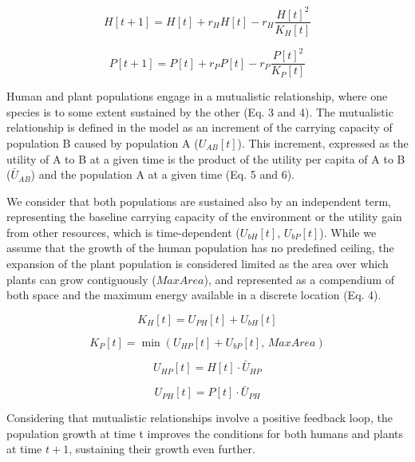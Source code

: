 \documentclass[
]{book}
\begin{document}
\begin{equation}
\tag{Eq. 1}
H[t+1]=H[t]+r_{H}H[t]-r_{H}\frac{H[t]^{2}}{K_{H}[t]}
\end{equation}

\begin{equation}
\tag{Eq. 2}
P[t+1]=P[t]+r_{P}P[t]-r_{P}\frac{P[t]^{2}}{K_{P}[t]}
\end{equation}

Human and plant populations engage in a mutualistic relationship, where one species is to some extent sustained by the other (Eq. 3 and 4). The mutualistic relationship is defined in the model as an increment of the carrying capacity of population B caused by population A (\(U_{AB}[t]\)). This increment, expressed as the utility of A to B at a given time is the product of the utility per capita of A to B (\(\bar{U}_{AB}\)) and the population A at a given time (Eq. 5 and 6).

We consider that both populations are sustained also by an independent term, representing the baseline carrying capacity of the environment or the utility gain from other resources, which is time-dependent (\(U_{bH}[t]\), \(U_{bP}[t]\)). While we assume that the growth of the human population has no predefined ceiling, the expansion of the plant population is considered limited as the area over which plants can grow contiguously (\(MaxArea\)), and represented as a compendium of both space and the maximum energy available in a discrete location (Eq. 4).

\begin{equation}
\tag{Eq. 3}
K_{H}[t]=U_{PH}[t]+U_{bH}[t]
\end{equation}

\begin{equation}
\tag{Eq. 4}
K_{P}[t]=\min(U_{HP}[t]+U_{bP}[t],\, MaxArea)
\end{equation}

\begin{equation}
\tag{Eq. 5}
U_{HP}[t]=H[t]\cdot \bar{U}_{HP}
\end{equation}

\begin{equation}
\tag{Eq. 6}
U_{PH}[t]=P[t]\cdot \bar{U}_{PH}
\end{equation}

Considering that mutualistic relationships involve a positive feedback loop, the population growth at time t improves the conditions for both humans and plants at time \(t + 1\), sustaining their growth even further.
\end{document}
